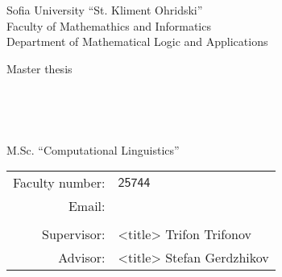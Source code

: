 \documentclass[main.tex]{subfiles}
\begin{document}
\begin{center}
    Sofia University ``St. Kliment Ohridski'' \\
    Faculty of Mathemathics and Informatics \\
    Department of Mathematical Logic and Applications
    \vspace{4cm}

    {\LARGE Master thesis} \\

    \vspace{1cm}

    {\huge \thetitle} \\

    \vspace{2cm}

    {\LARGE \theauthor} \\

    \vspace{5mm}

    {\large M.Sc. ``Computational Linguistics''} \\

    \vspace{3mm}

    \begin{tabular}{r l}
        Faculty number: & $\mathsf{25744}$ \\
        Email: & \code{\theemail} \\

    \vspace{1cm} \\
        \large Supervisor: & \large <title> Trifon Trifonov \\
        \large Advisor: & \large <title> Stefan Gerdzhikov \\
    \end{tabular}

    \vspace{4cm}

    {\large \thedate}
\end{center}
\thispagestyle{empty}

\pagebreak
\printtoc
\pagebreak
\end{document}

